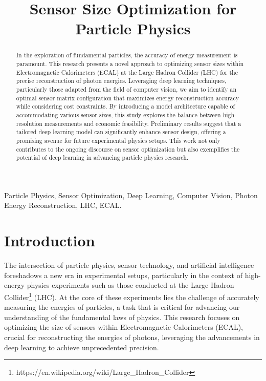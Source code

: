 \documentclass[conference]{IEEEtran}
\begin{document}
\title{Sensor Size Optimization for Particle Physics
}

\author{
}

\maketitle

\begin{abstract}
    In the exploration of fundamental particles, the accuracy of energy measurement is paramount. This research presents a novel approach to optimizing sensor sizes within Electromagnetic Calorimeters (ECAL) at the Large Hadron Collider (LHC) for the precise reconstruction of photon energies. Leveraging deep learning techniques, particularly those adapted from the field of computer vision, we aim to identify an optimal sensor matrix configuration that maximizes energy reconstruction accuracy while considering cost constraints. By introducing a model architecture capable of accommodating various sensor sizes, this study explores the balance between high-resolution measurements and economic feasibility. Preliminary results suggest that a tailored deep learning model can significantly enhance sensor design, offering a promising avenue for future experimental physics setups. This work not only contributes to the ongoing discourse on sensor optimization but also exemplifies the potential of deep learning in advancing particle physics research.
\end{abstract}

\begin{IEEEkeywords}
    Particle Physics, Sensor Optimization, Deep Learning, Computer Vision, Photon Energy Reconstruction, LHC, ECAL.
\end{IEEEkeywords}

\section{Introduction}
The intersection of particle physics, sensor technology, and artificial intelligence foreshadows a new era in experimental setups, particularly in the context of high-energy physics experiments such as those conducted at the Large Hadron Collider\footnote{https://en.wikipedia.org/wiki/Large\_Hadron\_Collider} (LHC). At the core of these experiments lies the challenge of accurately measuring the energies of particles, a task that is critical for advancing our understanding of the fundamental laws of physics. This research focuses on optimizing the size of sensors within Electromagnetic Calorimeters (ECAL), crucial for reconstructing the energies of photons, leveraging the advancements in deep learning to achieve unprecedented precision.
\end{document}

